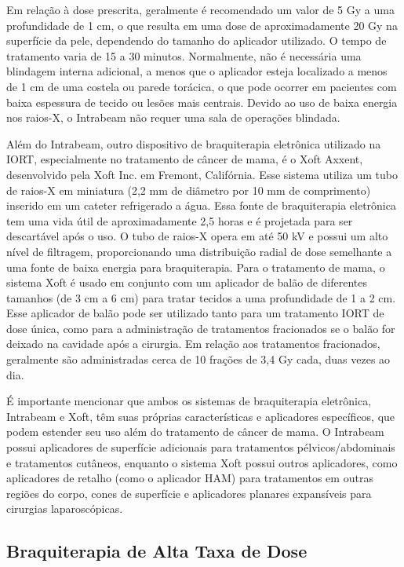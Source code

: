 \documentclass[11pt,a4paper]{article}
\begin{document}
	Em relação à dose prescrita, geralmente é recomendado um valor de 5 Gy a uma profundidade de 1 cm, o que resulta em uma dose de aproximadamente 20 Gy na superfície da pele, dependendo do tamanho do aplicador utilizado. O tempo de tratamento varia de 15 a 30 minutos. Normalmente, não é necessária uma blindagem interna adicional, a menos que o aplicador esteja localizado a menos de 1 cm de uma costela ou parede torácica, o que pode ocorrer em pacientes com baixa espessura de tecido ou lesões mais centrais. Devido ao uso de baixa energia nos raios-X, o Intrabeam não requer uma sala de operações blindada.

	Além do Intrabeam, outro dispositivo de braquiterapia eletrônica utilizado na IORT, especialmente no tratamento de câncer de mama, é o Xoft Axxent, desenvolvido pela Xoft Inc. em Fremont, Califórnia. Esse sistema utiliza um tubo de raios-X em miniatura (2,2 mm de diâmetro por 10 mm de comprimento) inserido em um cateter refrigerado a água. Essa fonte de braquiterapia eletrônica tem uma vida útil de aproximadamente 2,5 horas e é projetada para ser descartável após o uso. O tubo de raios-X opera em até 50 kV e possui um alto nível de filtragem, proporcionando uma distribuição radial de dose semelhante a uma fonte de baixa energia para braquiterapia. Para o tratamento de mama, o sistema Xoft é usado em conjunto com um aplicador de balão de diferentes tamanhos (de 3 cm a 6 cm) para tratar tecidos a uma profundidade de 1 a 2 cm. Esse aplicador de balão pode ser utilizado tanto para um tratamento IORT de dose única, como para a administração de tratamentos fracionados se o balão for deixado na cavidade após a cirurgia. Em relação aos tratamentos fracionados, geralmente são administradas cerca de 10 frações de 3,4 Gy cada, duas vezes ao dia.

	É importante mencionar que ambos os sistemas de braquiterapia eletrônica, Intrabeam e Xoft, têm suas próprias características e aplicadores específicos, que podem estender seu uso além do tratamento de câncer de mama. O Intrabeam possui aplicadores de superfície adicionais para tratamentos pélvicos/abdominais e tratamentos cutâneos, enquanto o sistema Xoft possui outros aplicadores, como aplicadores de retalho (como o aplicador HAM) para tratamentos em outras regiões do corpo, cones de superfície e aplicadores planares expansíveis para cirurgias laparoscópicas.

\subsection*{Braquiterapia de Alta Taxa de Dose}
\end{document}
